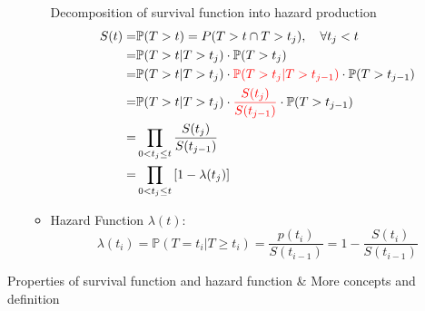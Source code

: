 \begin{itemize}[topsep=2pt,itemsep=0pt]
\begin{itemize}[topsep=2pt,itemsep=0pt]
        Decomposition of survival function into hazard production
        \begin{align}\label{EqaSurvivalFunctionDecomposition}
            S(t)=&\mathbb{P}(T>t)=P(T>t\cap T>t_j),\quad \forall t_j<t\notag\\
            =&\mathbb{P}(T>t|T>t_j)\cdot \mathbb{P}(T>t_j)\notag\\
            =&\mathbb{P}(T>t|T>t_j)\cdot {\color{red} \mathbb{P}(T>t_j|T>t_{j-1})}\cdot \mathbb{P}(T>t_{j-1})\notag\\
            =&\mathbb{P}(T>t|T>t_j)\cdot {\color{red}\dfrac{S(t_j)}{S(t_{j-1})}}\cdot \mathbb{P}(T>t_{j-1})\notag\\
            =&\prod_{0<t_j\leq t}\dfrac{S(t_j)}{S(t_{j-1})}\notag\\
            =&\prod_{0<t_j\leq t}\left[ 1-\lambda (t_j) \right] 
        \end{align}

        \item Hazard Function $ \lambda (t) $:
        \begin{equation}
            \lambda (t_i)=\mathbb{P}(T=t_i|T\geq t_i)=\dfrac{p(t_i)}{S(t_{i-1})} =1-\dfrac{S(t_i)}{S(t_{i-1})}
        \end{equation}
        
        
        
    \end{itemize}
    
        
\end{itemize}


\begin{point}
    Properties of survival function and hazard function \& More concepts and definition
\end{point}

